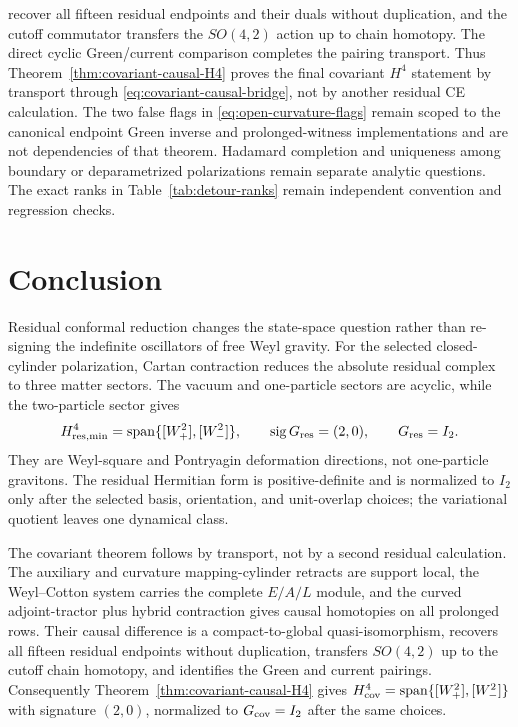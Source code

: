 \documentclass[11pt]{article}
\theoremstyle{definition}
\theoremstyle{remark}
\begin{document}
recover all fifteen residual endpoints and their duals without duplication,
and the cutoff commutator transfers the $SO(4,2)$ action up to chain homotopy.
The direct cyclic Green/current comparison completes the pairing transport.
Thus Theorem~\ref{thm:covariant-causal-H4} proves the final covariant $H^4$
statement by transport through \eqref{eq:covariant-causal-bridge}, not by
another residual CE calculation.  The two false flags in
\eqref{eq:open-curvature-flags} remain scoped to the canonical endpoint Green
inverse and prolonged-witness implementations and are not dependencies of
that theorem.  Hadamard completion and uniqueness among boundary or
deparametrized polarizations remain separate analytic questions.  The exact ranks in
Table~\ref{tab:detour-ranks} remain independent convention and regression
checks.

\section{Conclusion}\label{sec:conclusion}

Residual conformal reduction changes the state-space question rather than
re-signing the indefinite oscillators of free Weyl gravity.  For the selected
closed-cylinder polarization, Cartan contraction reduces the absolute
residual complex to three matter sectors.  The vacuum and one-particle
sectors are acyclic, while the two-particle sector gives
\begin{equation*}
 H^4_{\rm res,min}
 =\operatorname{span}\{[W_+^2],[W_-^2]\},
 \qquad \operatorname{sig}G_{\rm res}=(2,0),
 \qquad G_{\rm res}=I_2.
\end{equation*}
They are Weyl-square and Pontryagin deformation directions, not one-particle
gravitons.  The residual Hermitian form is positive-definite and is
normalized to $I_2$ only after the selected basis, orientation, and
unit-overlap choices; the variational quotient leaves one dynamical class.

The covariant theorem follows by transport, not by a second residual
calculation.  The auxiliary and curvature mapping-cylinder retracts are
support local, the Weyl--Cotton system carries the complete $E/A/L$ module,
and the curved adjoint-tractor plus hybrid contraction gives causal
homotopies on all prolonged rows.  Their causal difference is a
compact-to-global quasi-isomorphism, recovers all fifteen residual endpoints
without duplication, transfers $SO(4,2)$ up to the cutoff chain homotopy, and
identifies the Green and current pairings.  Consequently
Theorem~\ref{thm:covariant-causal-H4} gives
$H^4_{\rm cov}=\operatorname{span}\{[W_+^2],[W_-^2]\}$ with signature
$(2,0)$, normalized to $G_{\rm cov}=I_2$ after the same choices.
\end{document}
